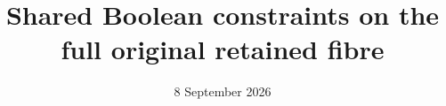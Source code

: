 \documentclass[11pt,a4paper]{article}
\begin{document}
\title{Shared Boolean constraints on the full original retained fibre}
\author{}
\date{8 September 2026}
\maketitle

\end{document}
